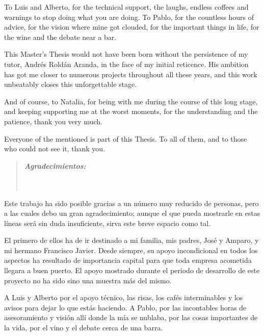 To Luis and Alberto, for the technical support, the laughs, endless coffees and warnings to stop doing what you are doing. To Pablo, for the countless hours of advice, for the vision where mine got clouded, for the important things in life, for the wine and the debate near a bar.

This Master's Thesis would not have been born without the persistence of my tutor, Andrés Roldán Aranda, in the face of my initial reticence. His ambition has got me closer to numerous projects throughout all these years, and this work unbeatably closes this unforgettable stage.

And of course, to Natalia, for being with me during the course of this long stage, and keeping supporting me at the worst moments, for the understanding and the patience, thank you very much.

Everyone of the mentioned is part of this Thesis. To all of them, and to those who could not see it, thank you.
\afterpage{\blankpage}


\newpage
\afterpage{\blankpage}



\begin{quotation}
\noindent \begin{center}
\textbf{\emph{\Large Agradecimientos:}}\textbf{\emph{\large }}\\
\textbf{\emph{\large }}\\
\textbf{\emph{\large }}\\
\textbf{\emph{\large }}
\par\end{center}{\large \par}
\end{quotation}

Este trabajo ha sido posible gracias a un número muy reducido de personas, pero a las cuales debo un gran agradecimiento; aunque el que pueda mostrarle en estas líneas será sin duda insuficiente, sirva este breve espacio como tal.

El primero de ellos ha de ir destinado a mi familia, mis padres, José y Amparo, y mi hermano Francisco Javier. Desde siempre, su apoyo incondicional en todos los aspectos ha resultado de importancia capital para que toda empresa acometida llegara a buen puerto. El apoyo mostrado durante el periodo de desarrollo de este proyecto no ha sido sino una muestra más del mismo.

A Luis y Alberto por el apoyo técnico, las risas, los cafés interminables y los avisos para dejar lo que estás haciendo. A Pablo, por las incontables horas de asesoramiento y visión allí donde la mía se nublaba, por las cosas  importantes de la vida, por el vino y el debate cerca de una barra.

